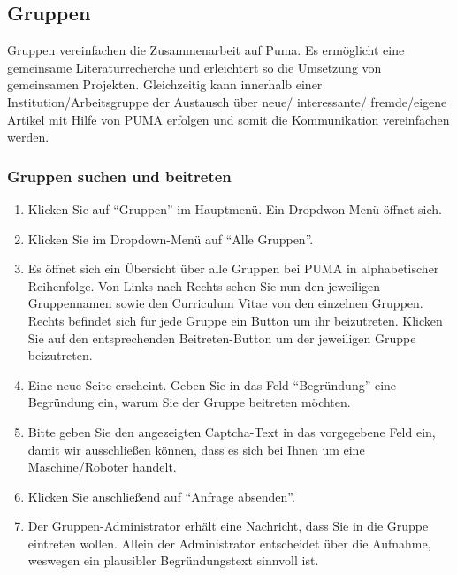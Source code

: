 \subsection{Gruppen}
Gruppen vereinfachen die Zusammenarbeit auf Puma. Es ermöglicht eine gemeinsame Literaturrecherche und erleichtert so die Umsetzung von gemeinsamen Projekten. Gleichzeitig kann innerhalb einer Institution/Arbeitsgruppe der Austausch über neue/ interessante/ fremde/eigene Artikel mit Hilfe von PUMA erfolgen und somit die Kommunikation vereinfachen werden. 
\subsubsection{Gruppen suchen und beitreten}%
\begin{enumerate}
    \item Klicken Sie auf \enquote{Gruppen} im Hauptmenü. Ein Dropdwon-Menü öffnet sich.
    \item Klicken Sie im Dropdown-Menü auf \enquote{Alle Gruppen}.
    \item Es öffnet sich ein Übersicht über alle Gruppen bei PUMA in alphabetischer Reihenfolge. Von Links nach Rechts sehen Sie nun den jeweiligen Gruppennamen sowie den Curriculum Vitae von den einzelnen Gruppen. Rechts befindet sich für jede Gruppe ein Button um ihr beizutreten. Klicken Sie auf den entsprechenden Beitreten-Button um der jeweiligen Gruppe beizutreten.
    \item Eine neue Seite erscheint. Geben Sie in das Feld \enquote{Begründung} eine Begründung ein, warum Sie der Gruppe beitreten möchten.
    \item Bitte geben Sie den angezeigten Captcha-Text in das vorgegebene Feld ein, damit wir ausschließen können, dass es sich bei Ihnen um eine Maschine/Roboter handelt.
    \item Klicken Sie anschließend auf \enquote{Anfrage absenden}.
    \item Der Gruppen-Administrator erhält eine Nachricht, dass Sie in die Gruppe eintreten wollen. Allein der Administrator entscheidet über die Aufnahme, weswegen ein plausibler Begründungstext sinnvoll ist.
\end{enumerate}
